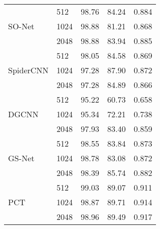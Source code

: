 \documentclass[10pt,twocolumn,letterpaper]{article}
\begin{document}
\begin{table}
\begin{tabular}{l|llll}
\hline
\multirow{3}{*}{SO-Net \cite{sonet}}     & \cellcolor{Apricot}512      & \cellcolor{Apricot}98.76   & \cellcolor{Apricot}84.24   & \cellcolor{Apricot}0.884   \\
                            & 1024     & 98.88   & 81.21   & 0.868  \\
                            & \cellcolor{Lavender}2048     & \cellcolor{Lavender}98.88   & \cellcolor{Lavender}83.94   & \cellcolor{Lavender}0.885   \\ 
\hline
\multirow{3}{*}{SpiderCNN \cite{xu2018spidercnn}}  & \cellcolor{Apricot}512      & \cellcolor{Apricot}98.05   & \cellcolor{Apricot}84.58   & \cellcolor{Apricot}0.869  \\
                            & 1024     & 97.28   & 87.90   & 0.872  \\
                            & \cellcolor{Lavender}2048     & \cellcolor{Lavender}97.28   & \cellcolor{Lavender}84.89   & \cellcolor{Lavender}0.866  \\ 
\hline
\multirow{3}{*}{DGCNN \cite{wang2019dynamic}}      & \cellcolor{Apricot}512      & \cellcolor{Apricot}95.22   & \cellcolor{Apricot}60.73   & \cellcolor{Apricot}0.658  \\
                            & 1024     & 95.34   & 72.21   & 0.738  \\
                            & \cellcolor{Lavender}2048     & \cellcolor{Lavender}97.93   & \cellcolor{Lavender}83.40    & \cellcolor{Lavender}0.859  \\ 
\hline
\multirow{3}{*}{GS-Net \cite{xu2020geometry}}
                            & \cellcolor{Apricot}512      & \cellcolor{Apricot}98.55   & \cellcolor{Apricot}83.84   & \cellcolor{Apricot}0.873  \\
                            & 1024     & 98.78   & 83.08   & 0.872  \\
                            & \cellcolor{Lavender}2048     & \cellcolor{Lavender}98.39   & \cellcolor{Lavender}85.74   & \cellcolor{Lavender}0.882  \\
\hline
\multirow{3}{*}{PCT \cite{guo2020pct}}
                            & \cellcolor{Apricot}512      & \cellcolor{Apricot}99.03   & \cellcolor{Apricot}89.07   & \cellcolor{Apricot}0.911  \\
                            & 1024     & 98.87   & 89.71   & 0.914  \\
                            & \cellcolor{Lavender}2048     & \cellcolor{Lavender}98.96   & \cellcolor{Lavender}89.49   & \cellcolor{Lavender}0.917  \\ 

\end{tabular}
\end{table}
\end{document}
